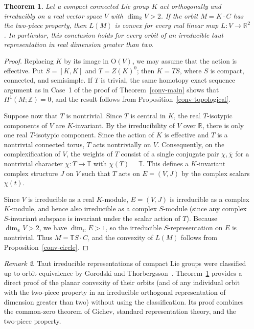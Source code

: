 \documentclass[11pt,reqno]{amsart}
\newtheorem{theorem}{Theorem}[section]
\theoremstyle{remark}
\newtheorem{remark}[theorem]{Remark}
\newcommand{\R}{\mathbb R}
\newcommand{\C}{\mathbb C}
\newcommand{\Z}{\mathbb Z}
\newcommand{\TT}{\mathbb T}
\begin{document}
\begin{theorem}\label{conv-irreducible-general}
Let a compact connected Lie group $K$ act orthogonally and
irreducibly on a real vector space $V$ with $\dim_\R V>2$.
If the orbit $M=K\cdot C$ has the two-piece property, then
$L(M)$ is convex for every real linear map $L:V\to\R^2$.
In particular, this conclusion holds for every orbit of an
irreducible taut representation in real dimension greater than two.
\end{theorem}
\begin{proof}
Replacing $K$ by its image in $\mathrm O(V)$, we may assume that the
action is effective. Put $S=[K,K]$ and $T=Z(K)^0$; then $K=TS$, where
$S$ is compact, connected, and semisimple. If $T$ is trivial, the same
homotopy exact sequence argument as in Case~1 of the proof of
Theorem~\ref{conv-main} shows that $H^1(M;\Z)=0$, and the result follows
from Proposition~\ref{conv-topological}.

Suppose now that $T$ is nontrivial. Since $T$ is central in $K$, the
real $T$-isotypic components of $V$ are $K$-invariant. By the
irreducibility of $V$ over $\R$, there is only one real $T$-isotypic
component. Since the action of $K$ is effective and $T$ is a nontrivial
connected torus, $T$ acts nontrivially on $V$. Consequently, on the
complexification of $V$, the weights of $T$ consist of a single
conjugate pair $\chi,\overline\chi$ for a nontrivial character
$\chi:T\to\TT$ with $\chi(T)=\TT$. This defines a $K$-invariant complex
structure $J$ on $V$ such that $T$ acts on $E=(V,J)$ by the complex
scalars $\chi(t)$.

Since $V$ is irreducible as a real $K$-module, $E=(V,J)$ is irreducible
as a complex $K$-module, and hence also irreducible as a complex
$S$-module (since any complex $S$-invariant subspace is invariant under
the scalar action of $T$). Because $\dim_\R V>2$, we have
$\dim_\C E>1$, so the irreducible $S$-representation on $E$ is
nontrivial. Thus $M=\TT S\cdot C$, and the convexity of $L(M)$ follows
from Proposition~\ref{conv-circle}.
\end{proof}

\begin{remark}
Taut irreducible representations of compact Lie groups were classified
up to orbit equivalence by Gorodski and
Thorbergsson~\cite{GorodskiThorbergsson2003}.
Theorem~\ref{conv-irreducible-general} provides a direct proof of the
planar convexity of their orbits (and of any individual orbit with the
two-piece property in an irreducible orthogonal representation of
dimension greater than two) without using the classification. Its proof
combines the common-zero theorem of Gichev, standard representation
theory, and the two-piece property.
\end{remark}
\end{document}
